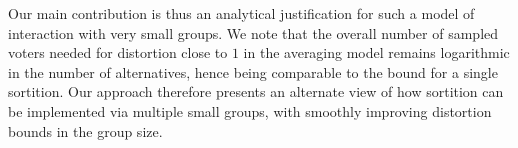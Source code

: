 Our main contribution is thus an analytical justification for such a model of interaction with very small groups. We note that the overall number of sampled voters needed for distortion close to $1$ in the averaging model remains logarithmic in the number of alternatives, hence being comparable to the bound for a single sortition. Our approach therefore presents an alternate view of how sortition can be implemented via multiple small groups, with smoothly improving distortion bounds in the group size.


